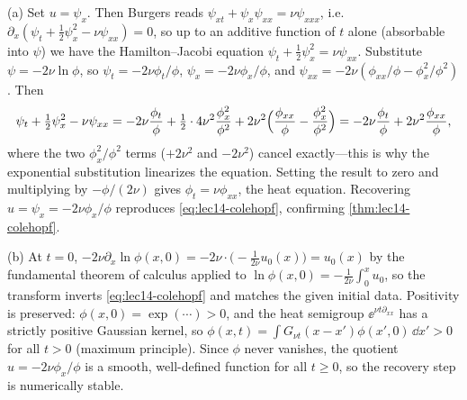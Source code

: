 \begin{solution}
(a) Set $u=\psi_x$. Then Burgers reads $\psi_{xt}+\psi_x\psi_{xx}=\nu\psi_{xxx}$, i.e.\
$\partial_x(\psi_t+\tfrac12\psi_x^2-\nu\psi_{xx})=0$, so up to an additive function of $t$ alone
(absorbable into $\psi$) we have the Hamilton--Jacobi equation $\psi_t+\tfrac12\psi_x^2
=\nu\psi_{xx}$. Substitute $\psi=-2\nu\ln\phi$, so $\psi_t=-2\nu\phi_t/\phi$,
$\psi_x=-2\nu\phi_x/\phi$, and $\psi_{xx}=-2\nu(\phi_{xx}/\phi-\phi_x^2/\phi^2)$. Then
\[
  \psi_t+\tfrac12\psi_x^2-\nu\psi_{xx}
  =-2\nu\frac{\phi_t}\phi+\tfrac12\cdot4\nu^2\frac{\phi_x^2}{\phi^2}
   +2\nu^2\Bigl(\frac{\phi_{xx}}\phi-\frac{\phi_x^2}{\phi^2}\Bigr)
  =-2\nu\frac{\phi_t}\phi+2\nu^2\frac{\phi_{xx}}\phi,
\]
where the two $\phi_x^2/\phi^2$ terms ($+2\nu^2$ and $-2\nu^2$) cancel exactly---this is why the
exponential substitution linearizes the equation. Setting the result to zero and multiplying by
$-\phi/(2\nu)$ gives $\phi_t=\nu\phi_{xx}$, the heat equation. Recovering
$u=\psi_x=-2\nu\phi_x/\phi$ reproduces \eqref{eq:lec14-colehopf}, confirming
\cref{thm:lec14-colehopf}.

(b) At $t=0$, $-2\nu\partial_x\ln\phi(x,0)=-2\nu\cdot\bigl(-\tfrac1{2\nu}u_0(x)\bigr)=u_0(x)$ by
the fundamental theorem of calculus applied to $\ln\phi(x,0)=-\tfrac1{2\nu}\int_0^x u_0$, so the
transform inverts \eqref{eq:lec14-colehopf} and matches the given initial data. Positivity is
preserved: $\phi(x,0)=\exp(\cdots)>0$, and the heat semigroup $\ee^{\nu t\partial_{xx}}$ has a
strictly positive Gaussian kernel, so $\phi(x,t)=\int G_{\nu t}(x-x')\phi(x',0)\,\dd x'>0$ for all
$t>0$ (maximum principle). Since $\phi$ never vanishes, the quotient $u=-2\nu\phi_x/\phi$ is a
smooth, well-defined function for all $t\ge0$, so the recovery step is numerically stable.
\end{solution}
